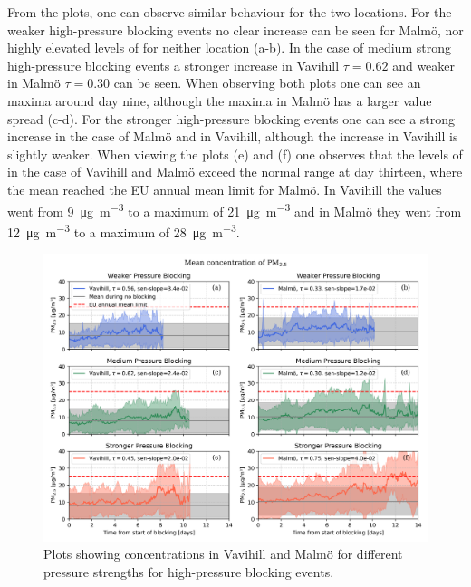 From the plots, one can observe similar behaviour for the two locations. For the weaker high-pressure blocking events no clear increase can be seen for Malmö, nor highly elevated levels of \PM for neither location (a-b). In the case of medium strong high-pressure blocking events a stronger increase in Vavihill $\tau=0.62$ and weaker in Malmö $\tau=0.30$ can be seen. When observing both plots one can see an maxima around day nine, although the maxima in Malmö has a larger value spread (c-d). For the stronger high-pressure blocking events one can see a strong increase in the case of Malmö and in Vavihill, although the increase in Vavihill is slightly weaker. When viewing the plots (e) and (f) one observes that the levels of \PM in the case of Vavihill and Malmö exceed the normal range at day thirteen, where the mean reached the EU annual mean limit for Malmö. In Vavihill the values went from \SI{9}{\micro\gram\per\meter\cubed} to a maximum of \SI{21}{\micro\gram\per\meter\cubed} and in Malmö they went from \SI{12}{\micro\gram\per\meter\cubed} to a maximum of \SI{28}{\micro\gram\per\meter\cubed}. 


\begin{figure}[H]
        \centering
        \includegraphics[width=\textwidth]{Figures/Meanplot_pressure.png}
        \caption{Plots showing \PM concentrations in Vavihill and Malmö for different pressure strengths for high-pressure blocking events.}
        \label{fig:Meanplot_pressure}
\end{figure}

 

